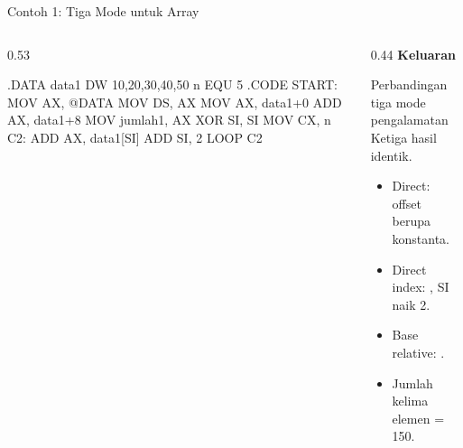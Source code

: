 \documentclass[aspectratio=169,11pt]{beamer}
\begin{document}
\begin{frame}[fragile]{Contoh 1: Tiga Mode untuk Array}
\begin{columns}[t]
\begin{column}{0.53\textwidth}
\begin{kodeasm}
.DATA
    data1 DW 10,20,30,40,50
    n     EQU 5
.CODE
START:
    MOV AX, @DATA
    MOV DS, AX
    MOV AX, data1+0
    ADD AX, data1+8
    MOV jumlah1, AX
    XOR SI, SI
    MOV CX, n
C2:
    ADD AX, data1[SI]
    ADD SI, 2
    LOOP C2
\end{kodeasm}
\end{column}
\begin{column}{0.44\textwidth}
\footnotesize
{\color{obeTeal}\bfseries Keluaran}\\[0.15em]
\begin{keluaran}
Perbandingan tiga mode pengalamatan
Ketiga hasil identik.
\end{keluaran}

\vspace{0.3em}
\begin{itemize}
    \item Direct: offset berupa konstanta.
    \item Direct index: , SI naik 2.
    \item Base relative: \code{[BX+SI]}.
    \item Jumlah kelima elemen = 150.
\end{itemize}
\end{column}
\end{columns}
\end{frame}
\end{document}
